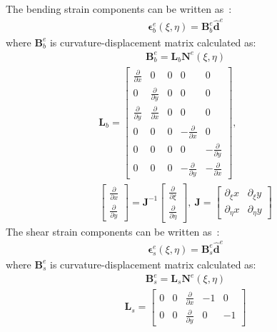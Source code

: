 \documentclass[materials,article,submit,moreauthors,pdftex]{Definitions/mdpi}
\providecommand{\DIFadd}[1]{{\protect\color{blue}{#1}}} %
\providecommand{\DIFaddbegin}{} %
\providecommand{\DIFaddend}{} %
\begin{document}
The bending strain components can be written as~\cite{ferreira2008matlab}:
\begin{eqnarray}
\boldsymbol{\epsilon}_b^e(\xi,\eta)=\textbf{B}_b^e\widehat{\textbf{d}}^e
\end{eqnarray}
where \(\textbf{B}_b^e\) is \DIFaddbegin \DIFadd{the }\DIFaddend curvature-displacement matrix calculated as:
\begin{eqnarray}
\textbf{B}_b^e=\textbf{L}_b\textbf{N}^e(\xi,\eta)
\end{eqnarray}
\begin{eqnarray}
\textbf{L}_b=\left [
\begin{array}{ccccc}
\frac{\partial }{\partial x} & 0 & 0 & 0 & 0\\
0 & \frac{\partial }{\partial y} & 0 & 0 & 0\\
\frac{\partial }{\partial y} & \frac{\partial }{\partial x} & 0 & 0 & 0\\
0 & 0 & 0 & -\frac{\partial }{\partial x} & 0\\
0 & 0 & 0 & 0 & -\frac{\partial }{\partial y}\\
0 & 0 & 0 & -\frac{\partial }{\partial y} & -\frac{\partial }{\partial x}
\end{array} \right],\ \\
\left [
\begin{array}{c}
\frac{\partial }{\partial x}\\
\frac{\partial }{\partial y}
\end{array} \right] =\textbf{J}^{-1}
\left [
\begin{array}{c}
\frac{\partial }{\partial \xi}\\
\frac{\partial }{\partial \eta}
\end{array} \right], \ 
\textbf{J}=\left [
\begin{array}{cc}
\partial_\xi x & {\partial_\xi y} \\
\partial_\eta x & {\partial_\eta y}
\end{array} \right] \nonumber
\end{eqnarray}
The shear strain components can be written as~\cite{ferreira2008matlab}:
\begin{eqnarray}
\boldsymbol{\epsilon}_s^e(\xi,\eta)=\textbf{B}_s^e\widehat{\textbf{d}}^e
\end{eqnarray}
where \(\textbf{B}_s^e\) is \DIFaddbegin \DIFadd{the }\DIFaddend curvature-displacement matrix calculated as:
\begin{eqnarray}
\textbf{B}_s^e=\textbf{L}_s\textbf{N}^e(\xi,\eta)
\end{eqnarray}
\begin{eqnarray}
\textbf{L}_s=\left [
\begin{array}{ccccc}
0 & 0 & \frac{\partial }{\partial x} & -1 & 0 \\
0 & 0 & \frac{\partial }{\partial y} & 0 & -1
\end{array} \right]
\end{eqnarray}
\end{document}
